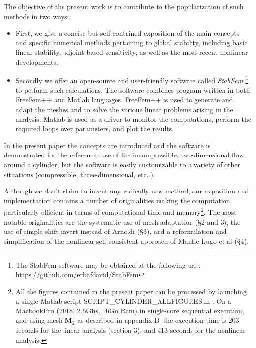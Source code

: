 \documentclass[twocolumn,10pt]{asme2ej}
\begin{document}
The objective of the present work is to contribute to the popularization of such methods 
in two ways:
\begin{itemize}
\item
First, we give a concise but self-contained exposition of the main concepts and 
specific numerical methods pertaining to global stability, including basic linear stability, adjoint-based sensitivity, as well as the most recent nonlinear developments.
\item
Secondly we offer an open-source and user-friendly software called  {\em StabFem} %
\footnote{The StabFem software may be obtained at the following url : \\
\url{https://github.com/erbafdavid/StabFem}
} 
to perform such calculations. The software combines program written in both FreeFem++ and Matlab languages. 
FreeFem++ is used to generate and adapt the meshes and to solve the various linear problems arising in the analysis. Matlab is used as a driver to monitor the computations, perform the required loops over parameters, and plot the results.
\end{itemize}

In the present paper the concepts are introduced and the software is demonstrated for the reference case of the incompressible, two-dimensional flow around a cylinder, but the software is easily customizable to a variety of other situations (compressible, three-dimensional, etc..).

Although we don't claim to invent any radically new method, our exposition and implementation contains a number of originalities making the computation particularly efficient in terms of computational time and memory\footnote{All the figures contained in the present paper can be processed by launching a single Matlab script {\sf SCRIPT\_CYLINDER\_ALLFIGURES.m} . On a MacbookPro (2018,  2.5Ghz, 16Go Ram) in single-core sequential execution,  and using mesh ${\mathbf M}_2$ as described in appendix B, the execution time is 203 seconds for the linear analysis (section 3), and 413 seconds for the nonlinear analysis.}.
The most notable originalities are the systematic use of mesh adaptation (\S 2 and 3), the use of simple shift-invert instead of Arnoldi (\S 3), and a reformulation and simplification of the nonlinear self-consistent approach of Mantic-Lugo et al  (\S 4).
 

\end{document}
